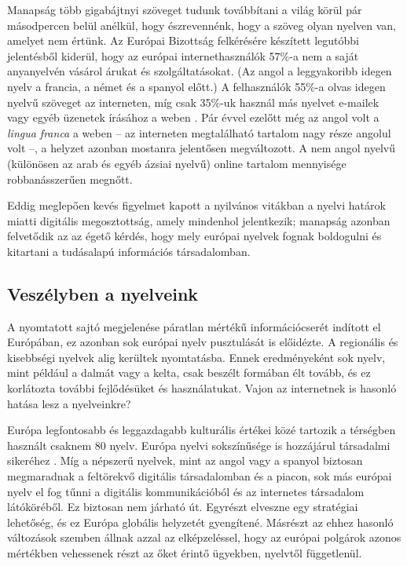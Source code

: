 \begin{multicols}{2}
Manapság több gigabájtnyi szöveget tu\-dunk továbbítani a világ körül pár másodpercen belül anélkül, hogy észrevennénk, hogy a szöveg olyan nyelven van, amelyet nem értünk. Az Európai Bizottság felkérésére készített legutóbbi jelentésből kiderül, hogy az európai internethasználók 57\%-a nem a saját anyanyelvén vásárol árukat és szolgáltatásokat. (Az angol a leggyakoribb idegen nyelv a francia, a német és a spanyol előtt.) A felhasználók 55\%-a olvas idegen nyelvű szöveget az interneten, míg csak 35\%-uk használ más nyelvet e-mailek vagy egyéb üzenetek írásához a weben \cite{EC1}.  Pár évvel ezelőtt még az angol volt a \textit{lingua franca} a weben -- az interneten megtalálható tartalom nagy része angolul volt --, a helyzet azonban mostanra jelentősen megváltozott. A nem angol nyelvű (különösen az arab és egyéb ázsiai nyelvű) online tartalom mennyisége rob\-ba\-nás\-sze\-rű\-en megnőtt. 

Eddig meglepően kevés figyelmet kapott a nyilvános vitákban a nyelvi határok miatti digitális megosztottság, amely mindenhol jelentkezik; manapság azonban felvetődik az az égető kérdés, hogy mely európai nyelvek fognak boldogulni és kitartani a tudásalapú információs társadalomban. 

\subsection{Veszélyben a nyelveink}

A nyomtatott sajtó megjelenése páratlan mértékű információcserét indított el Európában, ez azonban sok európai nyelv pusztulását is előidézte. A regionális és kisebbségi nyelvek alig kerültek nyom\-ta\-tás\-ba. Ennek eredményeként sok nyelv, mint például a dalmát vagy a kelta, csak beszélt formában élt tovább, és ez korlátozta további fejlődésüket és használatukat. Vajon az internetnek is hasonló hatása lesz a nyelveinkre?

Európa legfontosabb és leggazdagabb kulturális értékei közé tartozik a térségben használt csaknem 80 nyelv. Európa nyelvi sokszínűsége is hozzájárul társadalmi si\-ke\-ré\-hez \cite{EC2}.  Míg a népszerű nyelvek, mint az angol vagy a spanyol biztosan megmaradnak a feltörekvő digitális társadalomban és a piacon, sok más európai nyelv el fog tűnni a digitális kommunikációból és az internetes társadalom látóköréből. Ez biztosan nem járható út. Egyrészt elveszne egy stratégiai lehetőség, és ez Európa globális helyzetét gyengítené. Másrészt az ehhez hasonló változások szemben állnak azzal az elképzeléssel, hogy az európai polgárok azonos mértékben vehessenek részt az őket érintő ügyekben, nyelvtől függetlenül.


\end{multicols}
